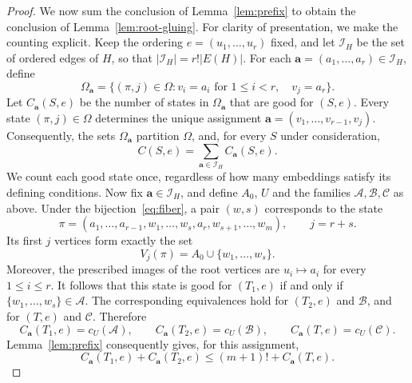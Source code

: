 \documentclass[11pt]{article}
\theoremstyle{remark}
\numberwithin{equation}{section}
\begin{document}
\begin{proof}
		We now sum the conclusion of Lemma~\ref{lem:prefix} to obtain the conclusion of Lemma~\ref{lem:root-gluing}. For clarity of presentation, we make the counting explicit. Keep the ordering
		$e=(u_1,\ldots,u_r)$ fixed, and let
		$\mathcal I_H$ be the set of ordered edges of $H$, so that
		$|\mathcal I_H|=r!|E(H)|$.
		For each $\mathbf a=(a_1,\ldots,a_r)\in\mathcal I_H$, define
		\[
		\Omega_{\mathbf a}
		=
		\{(\pi,j)\in\Omega:
		v_i=a_i\text{ for }1\le i<r,\quad v_j=a_r\}.
		\]
		Let $C_{\mathbf a}(S,e)$ be the number of states in
		$\Omega_{\mathbf a}$ that are good for $(S,e)$.
		Every state $(\pi,j)\in\Omega$ determines the unique assignment
		$\mathbf a=(v_1,\ldots,v_{r-1},v_j)$.
		Consequently, the sets $\Omega_{\mathbf a}$ partition $\Omega$,
		and, for every $S$ under consideration,
		\begin{equation}\label{eq:assignment-sum}
			C(S,e)
			=
			\sum_{\mathbf a\in\mathcal I_H}C_{\mathbf a}(S,e).
		\end{equation}
		We count each good state once, regardless of how many embeddings satisfy its defining conditions.
		Now fix $\mathbf a\in\mathcal I_H$, and define $A_0$, $U$ and
		the families $\mathcal A,\mathcal B,\mathcal C$ as above.
		Under the bijection~\eqref{eq:fiber}, a pair $(w,s)$ corresponds
		to the state
		\[
		\pi=(a_1,\ldots,a_{r-1},
		w_1,\ldots,w_s,a_r,w_{s+1},\ldots,w_m),
		\qquad j=r+s.
		\]
		Its first $j$ vertices form exactly the set
		\[
		V_j(\pi)=A_0\cup\{w_1,\ldots,w_s\}.
		\]
		Moreover, the prescribed images of the root vertices are
		$u_i\mapsto a_i$ for every $1\le i\le r$.
		It follows that this state is good for $(T_1,e)$ if and only
		if $\{w_1,\ldots,w_s\}\in\mathcal A$. The corresponding
		equivalences hold for $(T_2,e)$ and $\mathcal B$, and for
		$(T,e)$ and $\mathcal C$. Therefore
		\[
		C_{\mathbf a}(T_1,e)=c_U(\mathcal A),\qquad
		C_{\mathbf a}(T_2,e)=c_U(\mathcal B),\qquad
		C_{\mathbf a}(T,e)=c_U(\mathcal C).
		\]
		Lemma~\ref{lem:prefix} consequently gives, for this assignment,
		\[
		C_{\mathbf a}(T_1,e)+C_{\mathbf a}(T_2,e)
		\le (m+1)!+C_{\mathbf a}(T,e).
		\]
		

\end{proof}
\end{document}
